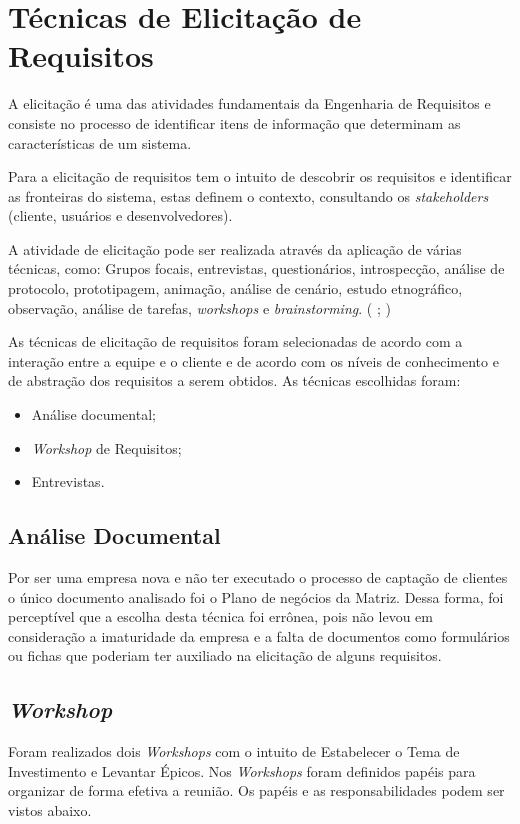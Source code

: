 \chapter[Técnicas de Elicitacao]{Técnicas de Elicitação de Requisitos}

A elicitação é uma das atividades fundamentais da Engenharia de Requisitos e consiste no processo de identificar
itens de informação que determinam as características de um sistema. \cite{jitnah} 

Para  a elicitação de requisitos tem o intuito de descobrir
os requisitos e identificar as fronteiras do sistema, estas definem o contexto, consultando os \textit{stakeholders} (cliente, usuários e desenvolvedores).

A atividade de elicitação pode ser realizada através da aplicação de várias técnicas, como: Grupos focais, entrevistas, questionários,
introspecção, análise de protocolo, prototipagem, animação, análise de cenário, estudo etnográfico, observação, análise de tarefas,
\textit{workshops} e \textit{brainstorming}. (\cite{jitnah} ; \cite{coulin})

\label{tecnicas}

As técnicas de elicitação de requisitos foram selecionadas de acordo com a interação entre a equipe e o cliente e de acordo com os níveis de conhecimento e de abstração dos requisitos a serem obtidos.
As técnicas escolhidas foram:\\
\begin{itemize}
\item Análise documental;
\item \textit{Workshop} de Requisitos;
\item Entrevistas.
\end{itemize}

\section{Análise Documental}
Por ser uma empresa nova e não ter executado o processo de captação de clientes o único documento analisado foi o Plano
de negócios da Matriz. Dessa forma, foi perceptível que a escolha desta técnica foi errônea, pois não levou
em consideração a imaturidade da empresa e a falta de documentos como formulários ou fichas que poderiam ter auxiliado
na elicitação de alguns requisitos.

\section{\textit{Workshop}}
  Foram realizados dois \textit{Workshops} com o intuito de Estabelecer o Tema de Investimento e Levantar Épicos. Nos \textit{Workshops}
  foram definidos papéis para organizar de forma efetiva a reunião. Os papéis e as responsabilidades podem ser vistos abaixo.
  
